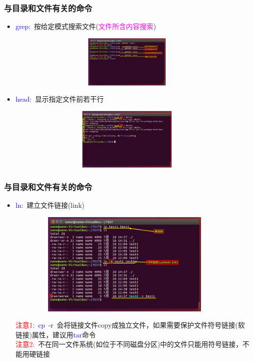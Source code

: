\frame
{
	\frametitle{与目录和文件有关的命令}
	\begin{itemize}
\setlength{\itemsep}{-10pt}
		\item \textcolor{blue}{grep}:~按给定模式搜索文件\textrm{(\textcolor{magenta}{文件所含内容搜索})}
\begin{figure}[h!]
\centering
\vspace{-12.5pt}
\includegraphics[height=1.0in,width=3.9in,viewport=0 250 800 470,clip]{Figures/Ubuntu-grep.png}
\label{Linux-command-grep}
\end{figure}
		\item \textcolor{blue}{head}:~显示指定文件前若干行
\begin{figure}[h!]
\centering
\vspace{-12.5pt}
\includegraphics[height=1.2in,width=3.9in,viewport=0 200 800 470,clip]{Figures/Ubuntu-head.png}
\label{Linux-command-head}
\end{figure}
\end{itemize}
}

\frame
{
	\frametitle{与目录和文件有关的命令}
	\begin{itemize}
		\item \textcolor{blue}{ln}:~建立文件链接\textrm{(link)}
\begin{figure}[h!]
\centering
\vspace{-18.5pt}
\includegraphics[height=2.0in,width=3.8in,viewport=0 50 800 470,clip]{Figures/Ubuntu-ln.png}
\label{Linux-command-ln}
\end{figure}
\vspace{-18.5pt}
\textcolor{red}{注意1:}~\textcolor{blue}{cp~-r}~会将链接文件\textrm{copy}成独立文件，如果需要保护文件符号链接\textrm{(软链接)}属性，建议用\textcolor{blue}{tar}命令\\
\textcolor{red}{注意2:}~不在同一文件系统\textrm{(如位于不同磁盘分区)}中的文件只能用符号链接，不能用硬链接
	\end{itemize}
}

